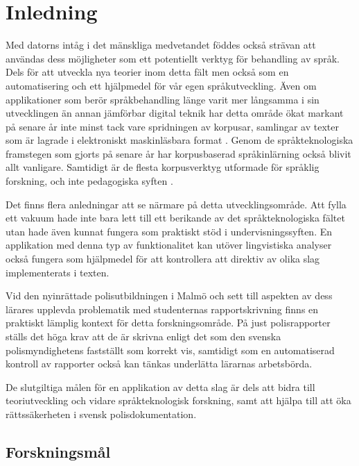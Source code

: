 \documentclass[swedish]{maucsthesis}
\begin{document}
\ifodd\value{page}\else\mbox{}\newpage\fi
\tableofcontents
\newpage
\startpagecount

\section{Inledning}
Med datorns intåg i det mänskliga medvetandet föddes också strävan att användas
dess möjligheter som ett potentiellt verktyg för behandling av språk. Dels för
att utveckla nya teorier inom detta fält men också som en automatisering och ett
hjälpmedel för vår egen språkutveckling. Även om applikationer som berör
språkbehandling länge varit mer långsamma i sin utvecklingen än annan jämförbar
digital teknik har detta område ökat markant på senare år inte minst tack vare
spridningen av korpusar, samlingar av texter som är lagrade i elektroniskt
maskinläsbara format \citep{nugues:2014}. Genom de språkteknologiska framstegen
som gjorts på senare år har korpusbaserad språkinlärning också blivit allt
vanligare. Samtidigt är de flesta korpusverktyg utformade för språklig
forskning, och inte pedagogiska syften \cite{zhu:2015}.

Det finns flera anledningar att se närmare på detta utvecklingsområde. Att fylla
ett vakuum hade inte bara lett till ett berikande av det språkteknologiska
fältet utan hade även kunnat fungera som praktiskt stöd i undervisningssyften.
En applikation med denna typ av funktionalitet kan utöver lingvistiska analyser
också fungera som hjälpmedel för att kontrollera att direktiv av olika slag
implementerats i texten.

Vid den nyinrättade polisutbildningen i Malmö och sett till aspekten av dess
lärares upplevda problematik med studenternas rapportskrivning finns en
praktiskt lämplig kontext för detta forskningsområde. På just polisrapporter
ställs det höga krav att de är skrivna enligt det som den svenska
polismyndighetens fastställt som korrekt vis, samtidigt som en automatiserad
kontroll av rapporter också kan tänkas underlätta lärarnas arbetsbörda.

De slutgiltiga målen för en applikation av detta slag är dels att bidra till
teoriutveckling och vidare språkteknologisk forskning, samt att hjälpa till att
öka rättssäkerheten i svensk polisdokumentation.

\subsection{Forskningsmål}
\end{document}
